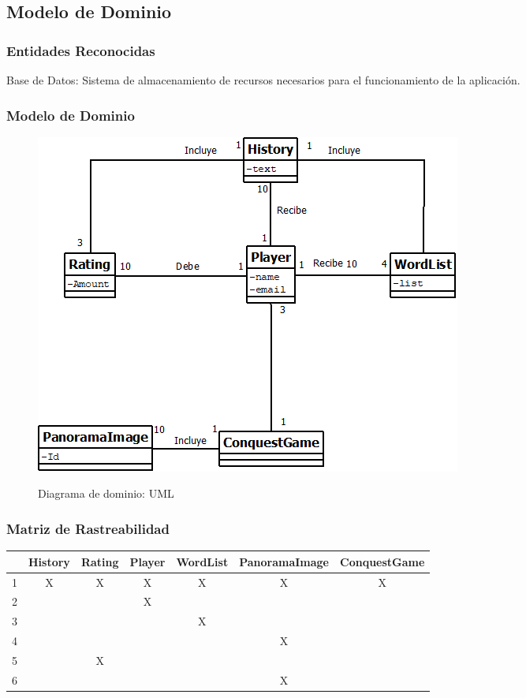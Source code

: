 \subsection{Modelo de Dominio}
\subsubsection{Entidades Reconocidas}
Base de Datos: Sistema de almacenamiento de recursos necesarios para el funcionamiento de la aplicación.
\subsubsection{Modelo de Dominio}
\begin{figure}[H]
\centering
   \includegraphics[scale=0.5]{imgs/ModeloDominio.png}
   \begin{center}
   Diagrama de dominio: UML
   \end{center}
\end{figure}
\subsubsection{Matriz de Rastreabilidad}
\begin{table}[H]
    \begin{center}
        \begin{tabular}{| c | c | c | c | c | c | c |}       
        	\hline 
        	 & History & Rating & Player & WordList & PanoramaImage & ConquestGame \\
        	\hline
        	1 & X & X & X & X & X & X \\
        	\hline
        	2 &  & & X &  &  &  \\
        	\hline
        	3 &  &  &  & X &  &  \\
        	\hline
        	4 &  &  &  &  & X &  \\
        	\hline
        	5 &  & X &  &  &  &  \\
        	\hline
        	6 &  &  &  &  & X &  \\
        	\hline
        \end{tabular}
    \end{center}
\end{table}